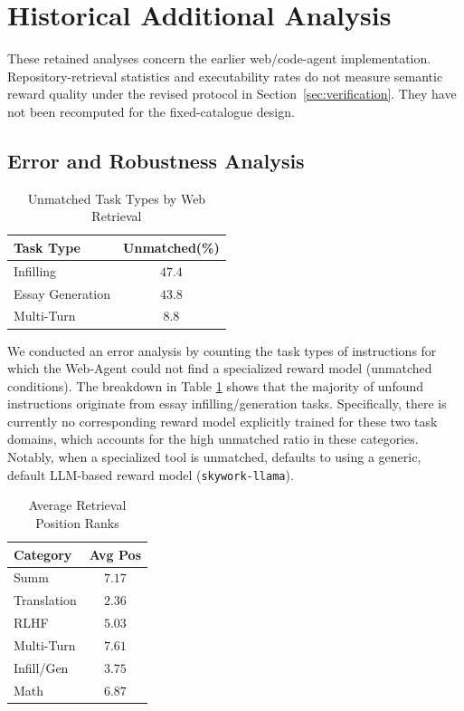\section{Historical Additional Analysis}

These retained analyses concern the earlier web/code-agent implementation. Repository-retrieval statistics and executability rates do not measure semantic reward quality under the revised protocol in Section~\ref{sec:verification}. They have not been recomputed for the fixed-catalogue design.



\subsection{Error and Robustness Analysis} \label{sec:error_robustness}


\begin{table}[t]
    \centering
    \caption{Unmatched Task Types by Web Retrieval}
    \label{tab:unmatched_errors}
    \begin{tabular}{lc}
      \toprule
      \textbf{Task Type} & \textbf{Unmatched(\%)}\\
      \midrule
      Infilling & $47.4$ \\
      Essay Generation & $43.8$ \\
      Multi-Turn & $8.8$ \\
      \bottomrule
    \end{tabular}
\end{table}


We conducted an error analysis by counting the task types of instructions for which the Web-Agent could not find a specialized reward model (unmatched conditions). The breakdown in Table \ref{tab:unmatched_errors} shows that the majority of unfound instructions originate from essay infilling/generation tasks. Specifically, there is currently no corresponding reward model explicitly trained for these two task domains, which accounts for the high unmatched ratio in these categories. Notably, when a specialized tool is unmatched, \method{} defaults to using a generic, default LLM-based reward model (\texttt{skywork-llama}).


\begin{table}[t]
    \centering
    \caption{Average Retrieval Position Ranks}
    \label{tab:search_robustness}
    \begin{tabular}{lc}
      \toprule
      \textbf{Category} & \textbf{Avg Pos}\\
      \midrule
      Summ & $7.17$ \\
      Translation & $2.36$ \\
      RLHF & $5.03$\\
      Multi-Turn & $7.61$ \\
      Infill/Gen & $3.75$ \\
      Math & $6.87$ \\
      \bottomrule
    \end{tabular}
\end{table}

